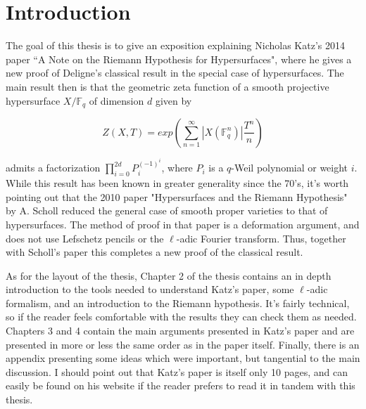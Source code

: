\documentclass{ucbthesis}
\theoremstyle{definition}
\theoremstyle{theorem}
\begin{document}
\pagestyle{headings}








\chapter{Introduction}

The goal of this thesis is to give an exposition explaining Nicholas Katz's 2014 paper ``A Note on the Riemann Hypothesis for Hypersurfaces", where he gives a new proof of Deligne's classical result in the special case of hypersurfaces. The main result then is that the geometric zeta function of a smooth projective hypersurface $X/\mathbb{F}_q$ of dimension $d$ given by 

$$ Z(X,T) = exp(\sum\limits_{n=1}^{\infty}|X(\mathbb{F}_{q}^{n})|\frac{T^{n}}{n})$$

\noindent admits a factorization $\prod\limits_{i=0}^{2d}P_{i}^{(-1)^{i}}$, where $P_{i}$ is a $q$-Weil polynomial or weight $i$. While this result has been known in greater generality since the 70's, it's worth pointing out that the 2010 paper "Hypersurfaces and the Riemann Hypothesis" by A. Scholl reduced the general case of smooth proper varieties to that of hypersurfaces. The method of proof in that paper is a deformation argument, and does not use Lefschetz pencils or the $\ell$-adic Fourier transform. Thus, together with Scholl's paper this completes a new proof of the classical result.

As for the layout of the thesis, Chapter 2 of the thesis contains an in depth introduction to the tools needed to understand Katz's paper, some $\ell$-adic formalism, and an introduction to the Riemann hypothesis. It's fairly technical, so if the reader feels comfortable with the results they can check them as needed. Chapters 3 and 4 contain the main arguments presented in Katz's paper and are presented in more or less the same order as in the paper itself. Finally, there is an appendix presenting some ideas which were important, but tangential to the main discussion. I should point out that Katz's paper is itself only 10 pages, and can easily be found on his website if the reader prefers to read it in tandem with this thesis. 
\end{document}
